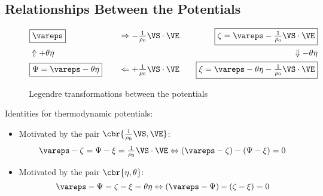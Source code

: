 \documentclass[a5paper,twosided,11pt,DIV=15,BCOR=0mm]{scrbook}
\newcommand{\veps}{\vareps}
\newcommand{\rhoz}{\tfrac{1}{\rho_0}}
\begin{document}
\subsection{Relationships Between the Potentials}
\begin{figure}[htbp]
  \centering
  \begin{alignat*}{3}
    &\boxed{\veps                }      && \Rightarrow -\rhoz\VS\cdot\VE      &\boxed{\zeta=\veps-\rhoz\VS\cdot\VE}\\
    &      \Uparrow +\theta\eta         &&                                    & \Downarrow -\theta\eta \\
    &\boxed{\Psi=\veps-\theta\eta} \quad&& \Leftarrow +\rhoz\VS\cdot\VE \quad&
    \boxed{\xi=\veps-\theta\eta-\rhoz\VS\cdot\VE}
  \end{alignat*}
  \caption{Legendre transformations between the potentials}
  \label{fig:legendre}
\end{figure}
Identities for thermodynamic potentials:
\begin{itemize}
\item Motivated by the pair $\cbr{\rhoz\VS,\VE}$:
  \begin{equation}
    \veps-\zeta=\Psi-\xi=\rhoz\VS\cdot\VE
    \Leftrightarrow (\veps-\zeta)-(\Psi-\xi) = 0
  \end{equation}
\item  Motivated by the pair $\cbr{\eta,\theta}$:
  \begin{equation}
    \veps-\Psi=\zeta-\xi=\theta\eta
    \Leftrightarrow (\veps-\Psi)-(\zeta-\xi) = 0
  \end{equation}
\end{itemize}
%
\end{document}
